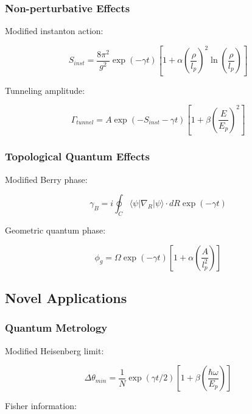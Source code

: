 \documentclass[12pt]{article}
\theoremstyle{plain}
\theoremstyle{definition}
\theoremstyle{remark}
\begin{document}
\subsubsection{Non-perturbative Effects}

Modified instanton action:

\begin{equation}
S_{inst} = \frac{8\pi^2}{g^2}\exp(-\gamma t)\left[1 + \alpha\left(\frac{\rho}{l_p}\right)^2\ln\left(\frac{\rho}{l_p}\right)\right]
\end{equation}

Tunneling amplitude:

\begin{equation}
\Gamma_{tunnel} = A\exp\left(-S_{inst} - \gamma t\right)\left[1 + \beta\left(\frac{E}{E_p}\right)^2\right]
\end{equation}

\subsubsection{Topological Quantum Effects}

Modified Berry phase:

\begin{equation}
\gamma_B = i\oint_C \langle\psi|\nabla_R|\psi\rangle\cdot dR\exp(-\gamma t)
\end{equation}

Geometric quantum phase:

\begin{equation}
\phi_g = \Omega\exp(-\gamma t)\left[1 + \alpha\left(\frac{A}{l_p^2}\right)\right]
\end{equation}

\subsection{Novel Applications}

\subsubsection{Quantum Metrology}

Modified Heisenberg limit:

\begin{equation}
\Delta\theta_{min} = \frac{1}{N}\exp(\gamma t/2)\left[1 + \beta\left(\frac{\hbar\omega}{E_p}\right)\right]
\end{equation}

Fisher information:
\end{document}

